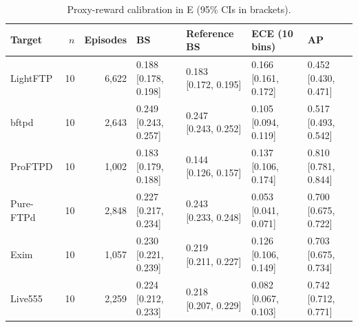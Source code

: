 \begin{table}[t]
\centering\footnotesize
\caption{Proxy-reward calibration in E (95\% CIs in brackets).}
\label{tab:logged_calibration}
\begin{tabularx}{\textwidth}{l r r *{4}{>{\centering\arraybackslash}X}}
\toprule
Target & $n$ & Episodes & BS & Reference BS & ECE (10 bins) & AP \\
\midrule
LightFTP & 10 & 6,622 & \shortstack{0.188\\{[0.178, 0.198]}} & \shortstack{0.183\\{[0.172, 0.195]}} & \shortstack{0.166\\{[0.161, 0.172]}} & \shortstack{0.452\\{[0.430, 0.471]}} \\
bftpd & 10 & 2,643 & \shortstack{0.249\\{[0.243, 0.257]}} & \shortstack{0.247\\{[0.243, 0.252]}} & \shortstack{0.105\\{[0.094, 0.119]}} & \shortstack{0.517\\{[0.493, 0.542]}} \\
ProFTPD & 10 & 1,002 & \shortstack{0.183\\{[0.179, 0.188]}} & \shortstack{0.144\\{[0.126, 0.157]}} & \shortstack{0.137\\{[0.106, 0.174]}} & \shortstack{0.810\\{[0.781, 0.844]}} \\
Pure-FTPd & 10 & 2,848 & \shortstack{0.227\\{[0.217, 0.234]}} & \shortstack{0.243\\{[0.233, 0.248]}} & \shortstack{0.053\\{[0.041, 0.071]}} & \shortstack{0.700\\{[0.675, 0.722]}} \\
Exim & 10 & 1,057 & \shortstack{0.230\\{[0.221, 0.239]}} & \shortstack{0.219\\{[0.211, 0.227]}} & \shortstack{0.126\\{[0.106, 0.149]}} & \shortstack{0.703\\{[0.675, 0.734]}} \\
Live555 & 10 & 2,259 & \shortstack{0.224\\{[0.212, 0.233]}} & \shortstack{0.218\\{[0.207, 0.229]}} & \shortstack{0.082\\{[0.067, 0.103]}} & \shortstack{0.742\\{[0.712, 0.771]}} \\

\end{tabularx}
\end{table}
